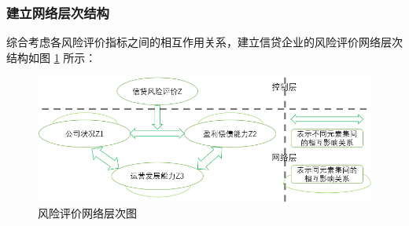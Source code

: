 \documentclass[withoutpreface,bwprint]{cumcmthesis}
\begin{document}
        \subsubsection{建立网络层次结构}
            综合考虑各风险评价指标之间的相互作用关系，建立信贷企业的风险评价网络层次结构如图 \ref{图：风险评价网络层次图} 所示：
            \begin{figure}[H]
                \begin{center}
                \includegraphics[width = 1.0\textwidth]{风险评价网络层次图.png}
                \caption{风险评价网络层次图}
                \label {图：风险评价网络层次图}
                \end{center}
            \end{figure}
\end{document}
